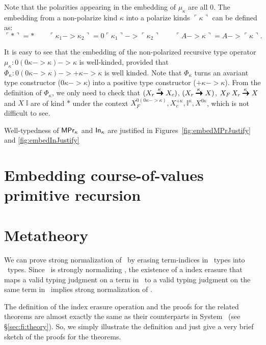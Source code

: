 Note that the polarities appearing in the embedding of $\mu_\kappa$ are all
$0$. The embedding from a non-polarize kind $\kappa$ into
a polarize kinds $\ulcorner\kappa\urcorner$ can be defined as:
\[ \ulcorner * \urcorner = * \qquad
\ulcorner \kappa_1 -> \kappa_2 \urcorner =
0\ulcorner\kappa_1\urcorner -> \ulcorner\kappa_2\urcorner \qquad
\ulcorner A -> \kappa \urcorner = A -> \ulcorner \kappa \urcorner.
\]

It is easy to see that the embedding of the non-polarized recursive
type operator $\mu_\kappa : 0(0\kappa -> \kappa) -> \kappa$
is well-kinded, provided that
$\Phi_\kappa : 0(0\kappa -> \kappa) -> +\kappa -> \kappa$
is well kinded. Note that $\Phi_\kappa$ turns an avariant type constructor
($0\kappa -> \kappa$) into a positive type constructor
($+\kappa -> \kappa$). From the definition of $\Phi_\kappa$, we only need 
to check that $(X_r \stackrel{\kappa\;}{\pmb{\pmb{->}}} X_c)$, $(X_r \stackrel{\kappa\;}{\pmb{\pmb{->}}} X)$,
$X_F\,X_r \stackrel{\kappa\;}{\pmb{\pmb{->}}} X$ and $X\;\mathbb{I}$ are of kind $*$
under the context $ X_{\!F}^{0(0\kappa -> \kappa)},
		X_c^{+\kappa}, \mathbb{I}^\kappa, X^{0\kappa}$,
which is not difficult to see.

Well-typedness of $\mathsf{MPr}_\kappa$ and $\mathsf{In}_\kappa$ are justified in
Figures~\ref{fig:embedMPrJustify} and \ref{fig:embedInJustify}

\section{Embedding course-of-values primitive recursion}
\label{sec:fixi:cv}

\section{Metatheory} \label{sec:fixi:theory}

We can prove strong normalization of \Fixi\ by erasing term-indices in \Fixi\ 
types into \Fixw\ types. Since \Fixw\ is strongly normalizing \cite{AbeMat04},
the existence of a index erasure that maps a valid typing judgment on a term
in \Fixi\ to a valid typing judgment on the same term in \Fixw\ implies
strong normalization of \Fixi.

The definition of the index erasure operation and the proofs for
the related theorems are almost exactly the same as their counterparts
in System \Fi\ (see \S\ref{sec:fi:theory}). So, we simply illustrate
the definition and just give a very brief sketch of the proofs for the
theorems.

